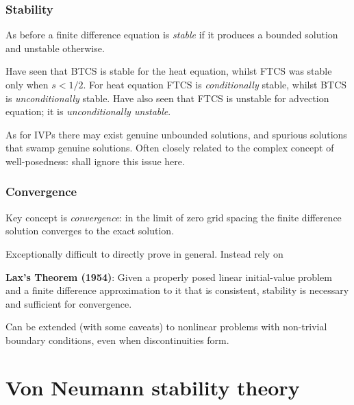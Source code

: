 \documentclass{beamer}
\begin{document}
\begin{frame}
  \frametitle{Stability}

  As before a finite difference equation is \emph{stable} if it
  produces a bounded solution and unstable otherwise. \pause

  \vspace{1ex}

  Have seen that BTCS is stable for the heat equation, whilst FTCS was
  stable only when $s < 1/2$. For heat equation FTCS is
  \emph{conditionally} stable, whilst BTCS is \emph{unconditionally}
  stable. \pause Have also seen that FTCS is unstable for advection
  equation; it is \emph{unconditionally unstable}. \pause

  \vspace{1ex}

  As for IVPs there may exist genuine unbounded solutions, and
  spurious solutions that swamp genuine solutions.  Often closely
  related to the complex concept of well-posedness: shall ignore this
  issue here.
  
\end{frame}

\begin{frame}
  \frametitle{Convergence}
  
  Key concept is \emph{convergence}: in the limit of zero grid spacing
  the finite difference solution converges to the exact
  solution. \pause

  \vspace{1ex}

  Exceptionally difficult to directly prove in general. \pause Instead
  rely on

  \vspace{2ex}

  {\bf Lax's Theorem (1954)}: Given a properly posed linear
  initial-value problem and a finite difference approximation to it
  that is consistent, stability is necessary and sufficient for
  convergence. \pause

  \vspace{2ex}

  Can be extended (with some caveats) to nonlinear problems with
  non-trivial boundary conditions, even when discontinuities form.

\end{frame}


\section{Von Neumann stability theory}
\end{document}
